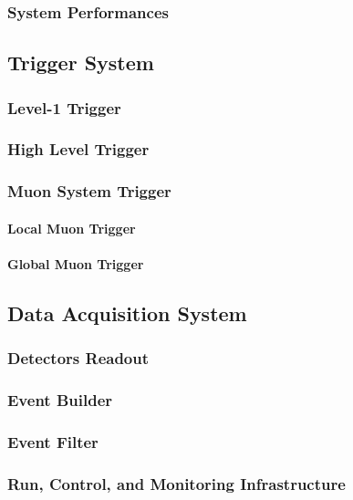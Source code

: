           \subsubsection{System Performances}

      \subsection{Trigger System}

          \subsubsection{Level-1 Trigger}

          \subsubsection{High Level Trigger}

          \subsubsection{Muon System Trigger}

              \paragraph{Local Muon Trigger}

              \paragraph{Global Muon Trigger}

      \subsection{Data Acquisition System}

          \subsubsection{Detectors Readout}

          \subsubsection{Event Builder}

          \subsubsection{Event Filter}

          \subsubsection{Run, Control, and Monitoring Infrastructure}
